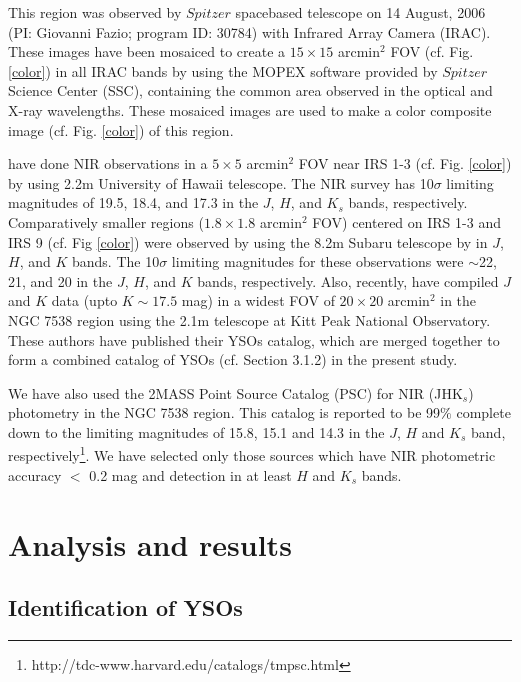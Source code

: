 \documentclass[a4paper,fleqn,usenatbib,useAMS]{mnras}
\begin{document}
This region was observed by $Spitzer$ spacebased telescope  on 14 August, 2006 (PI: Giovanni Fazio; program ID: 30784)
with Infrared Array Camera (IRAC). 
These images  have been mosaiced to create a $15\times15$ arcmin$^2$ FOV (cf. Fig. \ref{color})
in all IRAC bands by using the MOPEX software provided by $Spitzer$ Science Center (SSC),
containing the common area observed in the optical and X-ray wavelengths.
These mosaiced images are used to make a color composite image (cf. Fig. \ref{color}) 
of this region.

\citet{2004ApJ...616.1042O} have done NIR observations in a $5\times5$ arcmin$^2$ FOV
near IRS 1-3 (cf. Fig. \ref{color}) by using 2.2m University of Hawaii telescope. 
The NIR survey has 10$\sigma$ limiting magnitudes of 19.5, 18.4, and 17.3 in the $J$, $H$, and $K_s$ bands, respectively. 
Comparatively smaller regions ($1.8\times1.8$ arcmin$^2$  FOV) centered on IRS 1-3 and IRS 9 (cf. Fig \ref{color}) 
were observed by using the 8.2m Subaru telescope by \citet{2014MNRAS.443.3218M} in $J$, $H$, and $K$ bands. 
The 10$\sigma$ limiting magnitudes for these observations were $\sim$22, 21, and 20 in the $J$, $H$, and $K$ bands, respectively. 
Also, recently, \citet{2014MNRAS.439.3719C} have compiled $J$ and $K$ data (upto $K\sim17.5$ mag) in a widest FOV of $20\times20$ arcmin$^2$ 
in the NGC 7538 region using the 2.1m telescope at Kitt Peak National Observatory.  
These authors have published their YSOs catalog, 
which are  merged together to form a combined catalog of YSOs (cf. Section 3.1.2)
in the present study.

We have also used the 2MASS Point Source Catalog (PSC) \citep{2003yCat.2246....0C} for NIR (JHK$_s$)
photometry in the NGC 7538 region. This catalog is reported to be 99$\%$ complete down 
to the limiting magnitudes of 15.8, 15.1 and 14.3 in the $J$, $H$ and
$K_s$ band, respectively\footnote{http://tdc-www.harvard.edu/catalogs/tmpsc.html}.
We have selected only those sources which have NIR photometric accuracy $<$ 0.2 mag and detection
in at least $H$ and $K_s$ bands. 



\section{Analysis and results}

\subsection{Identification of  YSOs \label{idf}}
\end{document}
